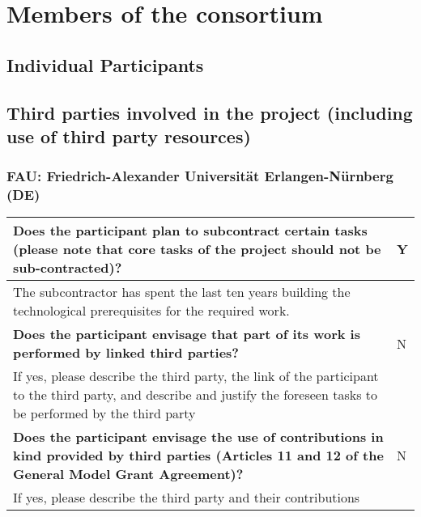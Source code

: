\chapter{Members of the consortium}

\section{Individual Participants}
\label{sec:partners}






























\section{Third parties involved in the project (including use of third party resources)}

\subsection{FAU: Friedrich-Alexander Universität Erlangen-Nürnberg (DE)}

\begin{longtable}{|p{}|p{}|}
\hline
{\bf Does the participant plan to subcontract certain tasks (please
  note that core tasks of the project should not be sub-contracted)?}
&
Y
\\
\hline
The subcontractor has spent the last ten years building the technological
prerequisites for the required work. 
&
\\
\hline
{\bf Does the participant envisage that  part of its work is performed
  by linked third parties?}
&
N
\\
\hline
If yes, please describe the third party, the link of the
participant to the third party, and describe and justify the foreseen
tasks to be performed by the third party
&
\\
\hline
{\bf Does the participant envisage the use of contributions in kind
provided by third parties (Articles 11 and 12 of the General Model
Grant Agreement)?}
&
N
\\
\hline
If yes, please describe the third party and their contributions
&
\\
\hline
\end{longtable}



